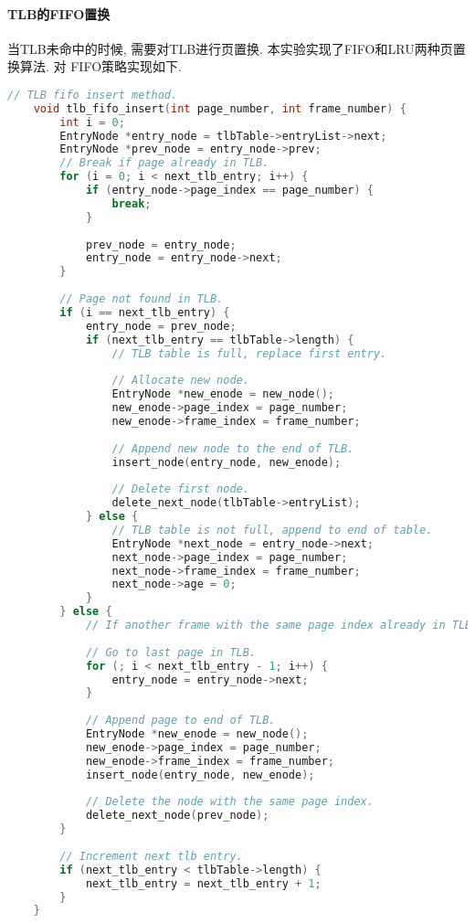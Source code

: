 \paragraph{TLB的FIFO置换}
当TLB未命中的时候, 需要对TLB进行页置换. 本实验实现了FIFO和LRU两种页置换算法. 对
FIFO策略实现如下.
\begin{lstlisting}[language=c++]
    // TLB fifo insert method.
    void tlb_fifo_insert(int page_number, int frame_number) {
        int i = 0;
        EntryNode *entry_node = tlbTable->entryList->next;
        EntryNode *prev_node = entry_node->prev;
        // Break if page already in TLB.
        for (i = 0; i < next_tlb_entry; i++) {
            if (entry_node->page_index == page_number) {
                break;
            }
    
            prev_node = entry_node;
            entry_node = entry_node->next;
        }
    
        // Page not found in TLB.
        if (i == next_tlb_entry) {
            entry_node = prev_node;
            if (next_tlb_entry == tlbTable->length) {
                // TLB table is full, replace first entry.
    
                // Allocate new node.
                EntryNode *new_enode = new_node();
                new_enode->page_index = page_number;
                new_enode->frame_index = frame_number;
    
                // Append new node to the end of TLB.
                insert_node(entry_node, new_enode);
    
                // Delete first node.
                delete_next_node(tlbTable->entryList);
            } else {
                // TLB table is not full, append to end of table.
                EntryNode *next_node = entry_node->next;
                next_node->page_index = page_number;
                next_node->frame_index = frame_number;
                next_node->age = 0;
            }
        } else {
            // If another frame with the same page index already in TLB.
    
            // Go to last page in TLB.
            for (; i < next_tlb_entry - 1; i++) {
                entry_node = entry_node->next;
            }
    
            // Append page to end of TLB.
            EntryNode *new_enode = new_node();
            new_enode->page_index = page_number;
            new_enode->frame_index = frame_number;
            insert_node(entry_node, new_enode);
    
            // Delete the node with the same page index.
            delete_next_node(prev_node);
        }
    
        // Increment next tlb entry.
        if (next_tlb_entry < tlbTable->length) {
            next_tlb_entry = next_tlb_entry + 1;
        }
    }
    
\end{lstlisting}

